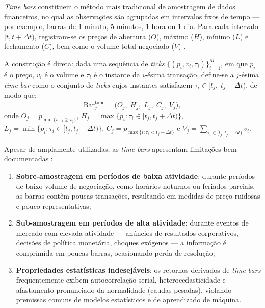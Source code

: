 \emph{Time bars} constituem o método mais tradicional de amostragem de dados
financeiros, no qual as observações são agrupadas em intervalos fixos de
tempo --- por exemplo, barras de 1 minuto, 5 minutos, 1 hora ou 1 dia.
Para cada intervalo $[t, t+\Delta t)$, registram-se os preços de abertura
($O$), máximo ($H$), mínimo ($L$) e fechamento ($C$), bem como o volume
total negociado ($V$) \cite{lopez2018advances}.

A construção é direta: dada uma sequência de \emph{ticks}
$\{(p_i, v_i, \tau_i)\}_{i=1}^{M}$, em que $p_i$ é o preço, $v_i$ é o
volume e $\tau_i$ é o instante da $i$-ésima transação, define-se a $j$-ésima
\emph{time bar} como o conjunto de \emph{ticks} cujos instantes satisfazem
$\tau_i \in [t_j,\; t_j + \Delta t)$, de modo que:
%
\begin{equation}
    \label{eq:time_bar}
    \text{Bar}_j^{\text{time}} =
    \bigl(O_j,\; H_j,\; L_j,\; C_j,\; V_j\bigr),
\end{equation}
%
onde $O_j = p_{\min\{i:\tau_i \ge t_j\}}$,
$H_j = \max\{p_i : \tau_i \in [t_j, t_j+\Delta t)\}$,
$L_j = \min\{p_i : \tau_i \in [t_j, t_j+\Delta t)\}$,
$C_j = p_{\max\{i:\tau_i < t_j+\Delta t\}}$ e
$V_j = \sum_{\tau_i \in [t_j, t_j+\Delta t)} v_i$.

Apesar de amplamente utilizadas, as \emph{time bars} apresentam limitações
bem documentadas \cite{lopez2018advances}:

\begin{enumerate}[label=\roman*)]
    \item \textbf{Sobre-amostragem em períodos de baixa atividade}: durante
          períodos de baixo volume de negociação, como horários noturnos ou
          feriados parciais, as barras contêm poucas transações, resultando
          em medidas de preço ruidosas e pouco representativas;
    \item \textbf{Sub-amostragem em períodos de alta atividade}: durante
          eventos de mercado com elevada atividade --- anúncios de resultados
          corporativos, decisões de política monetária, choques exógenos
          --- a informação é comprimida em poucas barras, ocasionando perda
          de resolução;
    \item \textbf{Propriedades estatísticas indesejáveis}: os retornos
          derivados de \emph{time bars} frequentemente exibem autocorrelação
          serial, heterocedasticidade e afastamento pronunciado da
          normalidade (caudas pesadas), violando premissas comuns de modelos
          estatísticos e de aprendizado de máquina.
\end{enumerate}

